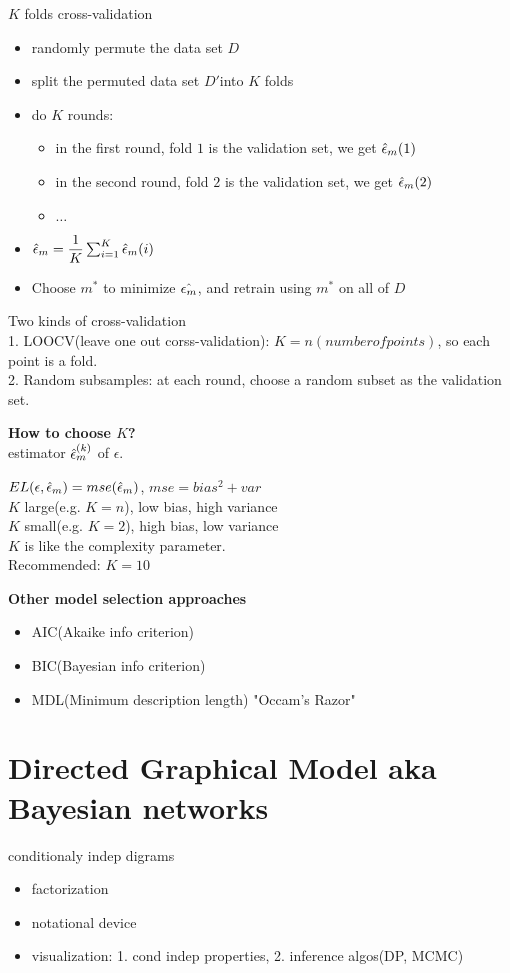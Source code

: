 \documentclass{article}
\begin{document}
$K$ folds cross-validation
\begin{itemize}
\item randomly permute the data set $D$
\item split the permuted data set $D'$into $K$ folds
\item do $K$ rounds:
	\begin{itemize}
	\item in the first round, fold $1$ is the validation set, we get $\hat{\epsilon}_m(1)$
	\item in the second round, fold $2$ is the validation set, we get $\hat{\epsilon}_m(2)$
	\item $\ldots$
	\end{itemize}
\item $\hat{\epsilon}_m = \dfrac{1}{K} \sum_{i=1}^K \hat{\epsilon}_m(i)$
\item Choose $m^*$ to minimize $\hat{\epsilon_m}$, and retrain using $m^*$ on all of $D$
\end{itemize}

Two kinds of cross-validation\\
1. LOOCV(leave one out corss-validation): $K = n(number of points)$, so each point is a fold.\\
2. Random subsamples: at each round, choose a random subset as the validation set.

\textbf{How to choose $K$?}\\
estimator $\hat{\epsilon}_m^{(k)}$ of $\epsilon$.

$EL(\epsilon,\hat{\epsilon}_m) = mse(\hat{\epsilon}_m)$, $mse = bias^2 + var$\\
$K$ large(e.g. $K=n$), low bias, high variance\\
$K$ small(e.g. $K=2$), high bias, low variance\\
$K$ is like the complexity parameter.\\
Recommended: $K = 10$

\textbf{Other model selection approaches}
\begin{itemize}
\item AIC(Akaike info criterion)
\item BIC(Bayesian info criterion)
\item MDL(Minimum description length) "Occam's Razor"
\end{itemize}

\section{Directed Graphical Model aka Bayesian networks}
conditionaly indep digrams
\begin{itemize}
\item factorization
\item notational device
\item visualization: 1. cond indep properties, 2. inference algos(DP, MCMC)
\end{itemize}
\end{document}
